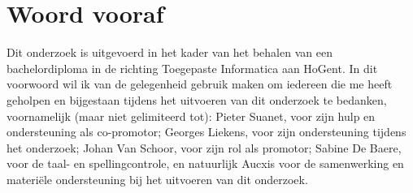 
\chapter{Woord vooraf}
\label{ch:voorwoord}


Dit onderzoek is uitgevoerd in het kader van het behalen van een bachelordiploma in de richting Toegepaste Informatica aan HoGent. In dit voorwoord wil ik van de gelegenheid gebruik maken om iedereen die me heeft geholpen en bijgestaan tijdens het uitvoeren van dit onderzoek te bedanken, voornamelijk (maar niet gelimiteerd tot): Pieter Suanet, voor zijn hulp en ondersteuning als co-promotor; Georges Liekens, voor zijn ondersteuning tijdens het onderzoek; Johan Van Schoor, voor zijn rol als promotor; Sabine De Baere, voor de taal- en spellingcontrole, en natuurlijk Aucxis voor de samenwerking en materiële ondersteuning bij het uitvoeren van dit onderzoek.